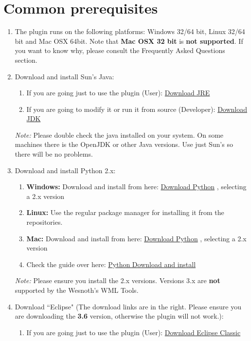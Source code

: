 \documentclass[10pt]{article}
\begin{document}
\section{Common prerequisites}
\begin{enumerate}
\item The plugin runs on the following platforms: Windows 32/64 bit, Linux 32/64 bit and Mac OSX 64bit. Note that \textbf{Mac OSX 32 bit} is \textbf{not supported}. If you want to know why, please consult the Frequently Asked Questions section.
\item Download and install Sun's Java:
\begin{enumerate}
\item If you are going just to use the plugin (User): \href{https://cds.sun.com/is-bin/INTERSHOP.enfinity/WFS/CDS-CDS_Developer-Site/en_US/-/USD/ViewProductDetail-Start?ProductRef=jre-6u21-oth-JPR@CDS-CDS_Developer}{Download JRE}
\item If you are going to modify it or run it from source (Developer): \href{http://java.sun.com/javase/downloads/widget/jdk6.jsp}{Download JDK}
\end{enumerate}
\textit{Note:} Please double check the java installed on your system. On some machines there is the OpenJDK or other Java versions. Use just Sun's so there will be no problems.
\item Download and install Python 2.x:
\begin{enumerate}
\item \textbf{Windows:} Download and install from here: \href{http://python.org/download/}{Download Python} , selecting a 2.x version
\item \textbf{Linux:} Use the regular package manager for installing it from the repositories.
\item \textbf{Mac:} Download and install from here: \href{http://python.org/download/}{Download Python} , selecting a 2.x version
\item Check the guide over here: \href{http://wiki.python.org/moin/BeginnersGuide/Download}{Python Download and install} 
\end{enumerate}
\textit{Note:} Please ensure you install the 2.x versions. Versions 3.x are \textbf{not} supported by the Wesnoth's WML Tools.
\item Download ``Eclipse" (The download links are in the right. Please ensure you are downloading the \textbf{3.6} version, otherwise the plugin will not work.):
\begin{enumerate}
\item If you are going just to use the plugin (User): \href{http://eclipse.org/downloads/packages/eclipse-classic-360/heliosr}{Download Eclipse Classic}

\end{enumerate}
\end{enumerate}
\end{document}
